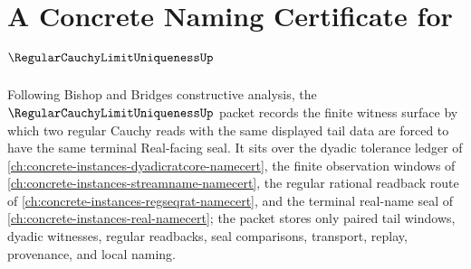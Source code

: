 \chapter{A Concrete Naming Certificate for $\RegularCauchyLimitUniquenessUp$}
\label{ch:concrete-instances-regular-cauchy-limit-uniqueness-namecert}

Following Bishop and Bridges constructive analysis, the $\RegularCauchyLimitUniquenessUp$ packet records the finite witness surface by which two regular Cauchy reads with the same displayed tail data are forced to have the same terminal Real-facing seal. It sits over the dyadic tolerance ledger of \autoref{ch:concrete-instances-dyadicratcore-namecert}, the finite observation windows of \autoref{ch:concrete-instances-streamname-namecert}, the regular rational readback route of \autoref{ch:concrete-instances-regseqrat-namecert}, and the terminal real-name seal of \autoref{ch:concrete-instances-real-namecert}; the packet stores only paired tail windows, dyadic witnesses, regular readbacks, seal comparisons, transport, replay, provenance, and local naming.

